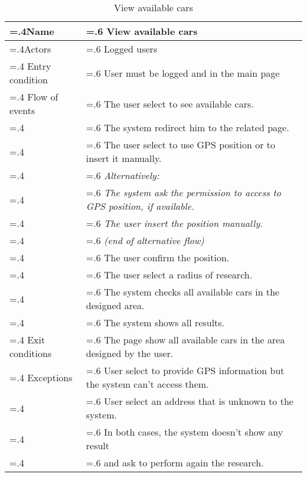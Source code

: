 \documentclass[10pt, a4paper,titlepage]{article}
\begin{document}
\begin{table}[h]
\caption{View available cars} \label{tab:scenario3}
\begin{tabularx}{\textwidth}{|>{\hsize=.4\hsize}X|>{\hsize=.6\hsize}X|}
\hline
Name & View available cars \\
\hline
Actors & Logged users \\
\hline
Entry condition & User must be logged and in the main page \\
\hline
Flow of events & The user select to see available cars.\\
& The system redirect him to the related page. \\
& The user select to use GPS position or to insert it manually.\\
& \textit{Alternatively:} \\
& \textit{The system ask the permission to access to GPS position, if available.}\\
& \textit{The user insert the position manually.} \\
& \textit{(end of alternative flow)}\\
& The user confirm the position.\\
& The user select a radius of research.\\
& The system checks all available cars in the designed area.\\
& The system shows all results.\\
\hline
Exit conditions & The page show all available cars in the area designed by the user. \\
\hline
Exceptions & User select to provide GPS information but the system can't access them.\\
& User select an address that is unknown to the system.\\
& In both cases, the system doesn't show any result\\
& and ask to perform again the research.\\
\hline
\end{tabularx}
\end{table}
\end{document}
